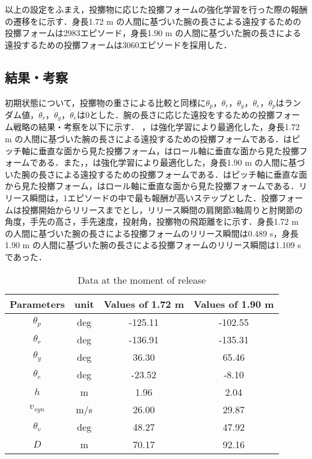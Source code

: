 以上の設定をふまえ，投擲物に応じた投擲フォームの強化学習を行った際の報酬の遷移をに示す．身長1.72 m の人間に基づいた腕の長さによる遠投するための投擲フォームは2983エピソード，身長1.90 m の人間に基づいた腕の長さによる遠投するための投擲フォームは3060エピソードを採用した．


\subsection{結果・考察}
初期状態について，投擲物の重さによる比較と同様に$\theta_{p}$，$\theta_{r}$，$\theta_{y}$，$\theta_{e}$，$\dot{\theta}_{p}$はランダム値，$\dot{\theta}_{r}$，$\dot{\theta}_{y}$，$\dot{\theta}_{e}$は0とした．腕の長さに応じた遠投をするための投擲フォーム戦略の結果・考察を以下に示す．
，は強化学習により最適化した，身長1.72 m の人間に基づいた腕の長さによる遠投するための投擲フォームである．はピッチ軸に垂直な面から見た投擲フォーム，はロール軸に垂直な面から見た投擲フォームである．また，，は強化学習により最適化した，身長1.90 m の人間に基づいた腕の長さによる遠投するための投擲フォームである．はピッチ軸に垂直な面から見た投擲フォーム，はロール軸に垂直な面から見た投擲フォームである．リリース瞬間は，1エピソードの中で最も報酬が高いステップとした．投擲フォームは投擲開始からリリースまでとし，リリース瞬間の肩関節3軸周りと肘関節の角度，手先の高さ，手先速度，投射角，投擲物の飛距離をに示す．身長1.72 m の人間に基づいた腕の長さによる投擲フォームのリリース瞬間は0.489 s，身長1.90 m の人間に基づいた腕の長さによる投擲フォームのリリース瞬間は1.109 sであった．

\begin{table}[tb]
  \begin{center}
    \caption{Data at the moment of release}

    \begin{tabular}{c|c|c|c}
      \hline
      Parameters & unit & Values of 1.72 m & Values of 1.90 m \\
      \hline
      $\theta_{p}$ & deg & -125.11 & -102.55 \\
      $\theta_{r}$ & deg & -136.91 & -135.31 \\
      $\theta_{y}$ & deg  & 36.30 & 65.46 \\
      $\theta_{e}$ & deg & -23.52 & -8.10 \\
      $h$ & m & 1.96 & 2.04 \\
      $v_{syn}$ & m/s & 26.00 & 29.87 \\
      $\theta_{v}$ & deg & 48.27 & 47.92 \\
      $D$ & m & 70.17 & 92.16 \\
      \hline
    \end{tabular}
  \end{center}
\end{table}

